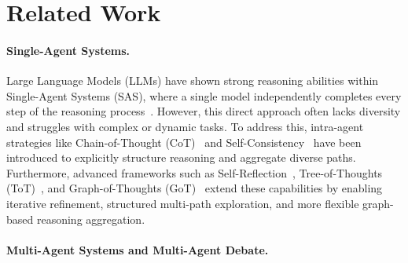\documentclass[11pt]{article}
\begin{document}
\section{Related Work}

\paragraph{Single-Agent Systems.}
Large Language Models (LLMs) have shown strong reasoning abilities within Single-Agent Systems (SAS), where a single model independently completes every step of the reasoning process~\cite{kojima2022large,wan2023better,mirzadeh2024gsm}.
However, this direct approach often lacks diversity and struggles with complex or dynamic tasks.
To address this, intra-agent strategies like Chain-of-Thought (CoT)~\cite{wei2022chain} and Self-Consistency~\cite{wangself} have been introduced to explicitly structure reasoning and aggregate diverse paths. Furthermore, advanced frameworks such as Self-Reflection~\cite{madaan2023self}, Tree-of-Thoughts (ToT)~\cite{yao2023tree}, and Graph-of-Thoughts (GoT)~\cite{besta2024graph} extend these capabilities by enabling iterative refinement, structured multi-path exploration, and more flexible graph-based reasoning aggregation.

\paragraph{Multi-Agent Systems and Multi-Agent Debate.} 
\end{document}
